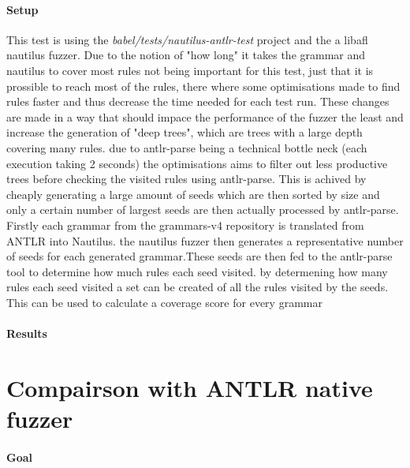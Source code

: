 \documentclass[thesis]{plai}
\begin{document}
\paragraph{Setup}
This test is using the \emph{babel/tests/nautilus-antlr-test} project and the a libafl nautilus fuzzer. Due to the notion of "how long" it takes the grammar and nautilus to cover most rules not being important for this test, just that it is prossible to reach most of the rules, there where some optimisations made to find rules faster and thus decrease the time needed for each test run. These changes are made in a way that should impace the performance of the fuzzer the least and increase the generation of "deep trees", which are trees with a large depth covering many rules. due to antlr-parse being a technical bottle neck (each execution taking 2 seconds) the optimisations aims to filter out less productive trees before checking the visited rules using antlr-parse. This is achived by cheaply generating a large amount of seeds which are then sorted by size and only a certain number of largest seeds are then actually processed by antlr-parse. \\
Firstly each grammar from the grammars-v4 repository is translated from ANTLR into Nautilus. the nautilus fuzzer then generates a representative number of seeds for each generated grammar.These seeds are then fed to the antlr-parse tool to determine how much rules each seed visited. by determening how many rules each seed visited a set can be created of all the rules visited by the seeds. This can be used to calculate a coverage score for every grammar 
\paragraph{Results}

\section{Compairson with ANTLR native fuzzer}
\label{section:fuzz-comp}
\paragraph{Goal} 
\end{document}
